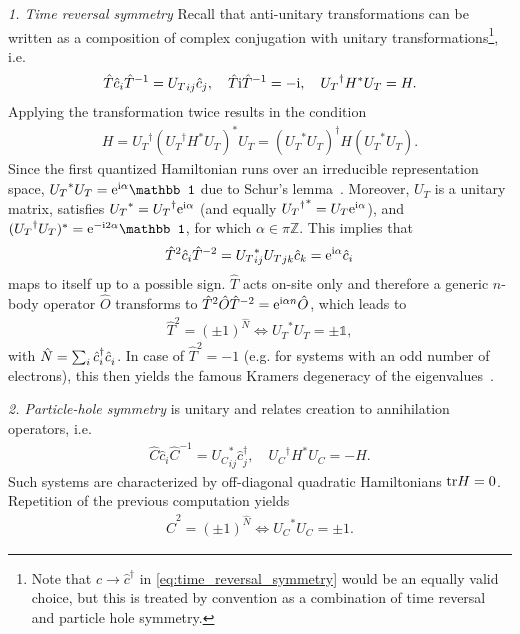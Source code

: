 {\it 1. Time reversal symmetry} Recall that anti-unitary transformations can be written as a composition of complex conjugation with unitary transformations\footnote{Note that $\hat c\rightarrow \hat c^\dag$ in \cref{eq:time_reversal_symmetry} would be an equally valid choice, but this is treated by convention as a combination of time reversal and particle hole symmetry.}, i.e.
\begin{align}
    \hat T \hat c_i \hat T^{-1} = {U_T}_{ij} \hat c_j
    ,\quad
    \hat T\mathrm i\hat T^{-1}=-\mathrm i
    ,\quad
    {U_T}^\dag H^* U_T = H.
    \label{eq:time_reversal_symmetry}
\end{align}
Applying the transformation twice results in the condition
\begin{align}
    H = {U_T}^\dag ({U_T}^\dag H^* U_T)^* U_T = ({U_T}^*U_T)^\dag H ({U_T}^* U_T).
\end{align}
Since the first quantized Hamiltonian runs over an irreducible representation space, ${U_T}^* U_T = \re^{\ri\alpha}\mathbb1$ due to Schur's lemma~\cite{Chiu2016}.
Moreover, $U_T$ is a unitary matrix, satisfies ${U_T}^*={U_T}^\dag\mathrm e^{\mathrm i\alpha}$ (and equally ${{U_T}^\dag}^* = U_T\mathrm e^{\mathrm i\alpha}$), and $({U_T}^\dag U_T)^* = \re^{-\ri2\alpha}\mathbb1$, for which $\alpha\in\pi\mathds Z$.
This implies that
\begin{align}
    \hat T^2 \hat c_i \hat T^{-2} = {U_T}_{ij}^*{U_T}_{jk} \hat c_k = \mathrm e^{\mathrm i\alpha}\hat c_i
\end{align}
maps to itself up to a possible sign.
$\hat T$ acts on-site only and therefore a generic $n$-body operator $\hat O$ transforms to $\hat T^2\hat O \hat T^{-2} = \mathrm e^{\mathrm i\alpha n}\hat O$, which leads to
\begin{align}
    \hat T^2 = (\pm 1)^{\hat N}\Leftrightarrow {U_T}^* {U_T} = \pm\mathbb1,
\end{align}
with $\hat N = \sum_i \hat c^\dag_i \hat c^\pdag_i$.
In case of $\hat T^2=-1$ (e.g. for systems with an odd number of electrons), this then yields the famous Kramers degeneracy of the eigenvalues~\cite{Schwabl2007}.

{\it 2. Particle-hole symmetry} is unitary and relates creation to annihilation operators, i.e.
\begin{align}
    \hat C \hat c_i \hat C^{-1} = {U_C}^*_{ij} \hat c^\dag_j
    ,\quad
    {U_C}^\dag H^* {U_C} = -H
    .
\end{align}
Such systems are characterized by off-diagonal quadratic Hamiltonians ${\rm tr} H=0$.
Repetition of the previous computation yields
\begin{align}
    \hat C^2 = (\pm1)^{\hat N}
    \Leftrightarrow
    {U_C}^* {U_C} = \pm 1.
\end{align}

